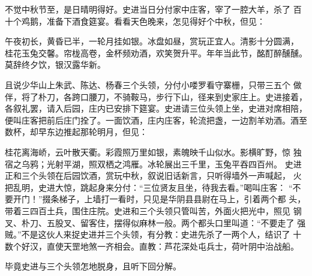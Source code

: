 不觉中秋节至，是日晴明得好。史进当日分付家中庄客，宰了一腔大羊，杀了
百十个鸡鹅，准备下酒食筵宴。看看天色晚来，怎见得好个中秋，但见：

午夜初长，黄昏已半，一轮月挂如银。冰盘如昼，赏玩正宜人。清影十分圆满，
桂花玉兔交馨。帘栊高卷，金杯频劝酒，欢笑贺升平。年年当此节，酩酊醉醺醺。
莫辞终夕饮，银汉露华新。

且说少华山上朱武、陈达、杨春三个头领，分付小喽罗看守寨栅，只带三五个
做伴，将了朴刀，各跨口腰刀，不骑鞍马，步行下山，径来到史家庄上。史进接着，
各叙礼罢，请入后园，庄内已安排下筵宴。史进请三位头领上坐，史进对席相陪，
便叫庄客把前后庄门拴了。一面饮酒，庄内庄客，轮流把盏，一边割羊劝酒。酒至
数杯，却早东边推起那轮明月，但见：

桂花离海峤，云叶散天衢。彩霞照万里如银，素魄映千山似水。影横旷野，惊
独宿之乌鸦；光射平湖，照双栖之鸿雁。冰轮展出三千里，玉兔平吞四百州。
史进正和三个头领在后园饮酒，赏玩中秋，叙说旧话新言，只听得墙外一声喊起，
火把乱明，史进大惊，跳起身来分付：“三位贤友且坐，待我去看。”喝叫庄客：
“不要开门！”掇条梯子，上墙打一看时，只见是华阴县县尉在马上，引着两个都
头，带着三四百土兵，围住庄院。史进和三个头领只管叫苦，外面火把光中，照见
钢叉、朴刀、五股叉、留客住，摆得似麻林一般。两个都头口里叫道：“不要走了
强贼。”不是这伙人来捉史进并三个头领，有分教：史进先杀了一两个人，结识了
十数个好汉，直使天罡地煞一齐相会。直教：芦花深处屯兵士，荷叶阴中治战船。

毕竟史进与三个头领怎地脱身，且听下回分解。